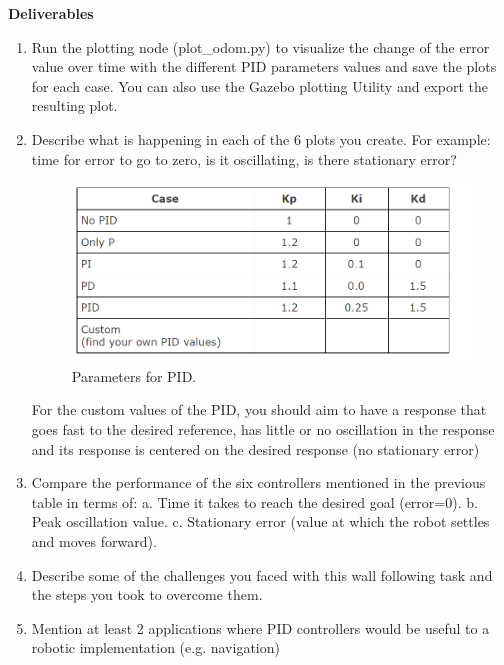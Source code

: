 \documentclass[12pt]{article}
\begin{document}
\textbf{Deliverables}
\begin{enumerate}
    \item Run the plotting node (plot\_odom.py) to visualize the change of the error value over time with the different PID parameters values and save the plots for each case. You can also use the Gazebo plotting Utility and export the resulting plot.
    
    \item Describe what is happening in each of the 6 plots you create. For example: time for error to go to zero, is it oscillating, is there stationary error?
    
    \begin{figure}[H]
        \centering\includegraphics[width=14cm]{images/pidparameter.png}\vspace{-10pt}
        \caption{Parameters for PID.}\label{fig:pid_2}
    \end{figure}
    
    For the custom values of the PID, you should aim to have a response that goes fast to the desired reference, has little or no oscillation in the response and its response is centered on the desired response (no stationary error)
    
    \item Compare the performance of the six controllers mentioned in the previous table in terms of:
    a. Time it takes to reach the desired goal (error=0).
    b. Peak oscillation value.
    c. Stationary error (value at which the robot settles and moves forward).
    
    \item Describe some of the challenges you faced with this wall following task and the steps you took to overcome them.
    
    \item Mention at least 2 applications where PID controllers would be useful to a robotic implementation (e.g. navigation)
\end{enumerate}
\end{document}
